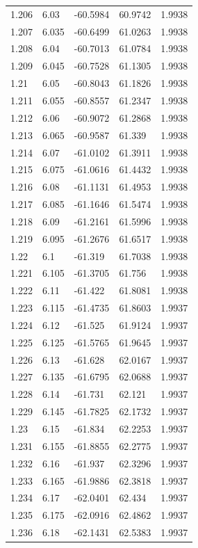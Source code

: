 \begin{tabular}{lllll}
1.206 & 6.03 & -60.5984 & 60.9742 & 1.9938 \\
1.207 & 6.035 & -60.6499 & 61.0263 & 1.9938 \\
1.208 & 6.04 & -60.7013 & 61.0784 & 1.9938 \\
1.209 & 6.045 & -60.7528 & 61.1305 & 1.9938 \\
1.21 & 6.05 & -60.8043 & 61.1826 & 1.9938 \\
1.211 & 6.055 & -60.8557 & 61.2347 & 1.9938 \\
1.212 & 6.06 & -60.9072 & 61.2868 & 1.9938 \\
1.213 & 6.065 & -60.9587 & 61.339 & 1.9938 \\
1.214 & 6.07 & -61.0102 & 61.3911 & 1.9938 \\
1.215 & 6.075 & -61.0616 & 61.4432 & 1.9938 \\
1.216 & 6.08 & -61.1131 & 61.4953 & 1.9938 \\
1.217 & 6.085 & -61.1646 & 61.5474 & 1.9938 \\
1.218 & 6.09 & -61.2161 & 61.5996 & 1.9938 \\
1.219 & 6.095 & -61.2676 & 61.6517 & 1.9938 \\
1.22 & 6.1 & -61.319 & 61.7038 & 1.9938 \\
1.221 & 6.105 & -61.3705 & 61.756 & 1.9938 \\
1.222 & 6.11 & -61.422 & 61.8081 & 1.9938 \\
1.223 & 6.115 & -61.4735 & 61.8603 & 1.9937 \\
1.224 & 6.12 & -61.525 & 61.9124 & 1.9937 \\
1.225 & 6.125 & -61.5765 & 61.9645 & 1.9937 \\
1.226 & 6.13 & -61.628 & 62.0167 & 1.9937 \\
1.227 & 6.135 & -61.6795 & 62.0688 & 1.9937 \\
1.228 & 6.14 & -61.731 & 62.121 & 1.9937 \\
1.229 & 6.145 & -61.7825 & 62.1732 & 1.9937 \\
1.23 & 6.15 & -61.834 & 62.2253 & 1.9937 \\
1.231 & 6.155 & -61.8855 & 62.2775 & 1.9937 \\
1.232 & 6.16 & -61.937 & 62.3296 & 1.9937 \\
1.233 & 6.165 & -61.9886 & 62.3818 & 1.9937 \\
1.234 & 6.17 & -62.0401 & 62.434 & 1.9937 \\
1.235 & 6.175 & -62.0916 & 62.4862 & 1.9937 \\
1.236 & 6.18 & -62.1431 & 62.5383 & 1.9937 \\

\end{tabular}
